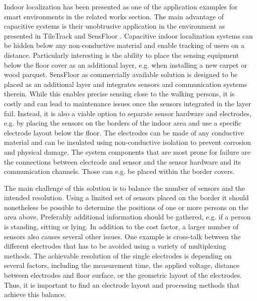 Indoor localization has been presented as one of the application examples for smart environments in the related works section. The main advantage of capacitive systems is their unobtrusive application in the environment as presented in TileTrack \cite{Valtonen2009a} and SensFloor \cite{lauterbach2009}. Capacitive indoor localization systems can be hidden below any non-conductive material and enable tracking of users on a distance. Particularly interesting is the ability to place the sensing equipment below the floor cover as an additional layer, e.g. when installing a new carpet or wood parquet. SensFloor as commercially available solution is designed to be placed as an additional layer and integrates sensors and communication systems therein. While this enables precise sensing close to the walking persons, it is costly and can lead to maintenance issues once the sensors integrated in the layer fail. Instead, it is also a viable option to separate sensor hardware and electrodes, e.g. by placing the sensors on the borders of the indoor area and use a specific electrode layout below the floor. The electrodes can be made of any conductive material and can be insulated using non-conductive isolation to prevent corrosion and physical damage. The system components that are most prone for failure are the connections between electrode and sensor and the sensor hardware and its communication channels. Those can e.g. be placed within the border covers.

The main challenge of this solution is to balance the number of sensors and the intended resolution. Using a limited set of sensors placed on the border it should nonetheless be possible to determine the positions of one or more persons on the area above. Preferably additional information should be gathered, e.g. if a person is standing, sitting or lying. In addition to the cost factor, a larger number of sensors also causes several other issues. One example is cross-talk between the different electrodes that has to be avoided using a variety of multiplexing methods. The achievable resolution of the single electrodes is depending on several factors, including the measurement time, the applied voltage, distance between electrodes and floor surface, or the geometric layout of the electrodes. Thus, it is important to find an electrode layout and processing methods that achieve this balance.

